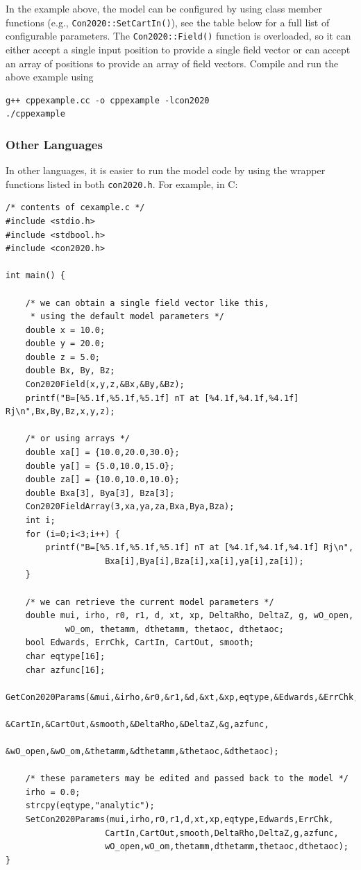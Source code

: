	In the example above, the model can be configured by using class member functions (e.g., \texttt{Con2020::SetCartIn()}), see the table below for a full list of configurable parameters. The \texttt{Con2020::Field()} function is overloaded, so it can either accept a single input position to provide a single field vector or can accept an array of positions to provide an array of field vectors. Compile and run the above example using
	
	\begin{verbatim}
g++ cppexample.cc -o cppexample -lcon2020
./cppexample
	\end{verbatim}
	
	\subsubsection{Other Languages}
	
	In other languages, it is easier to run the model code by using the wrapper functions listed in both \texttt{con2020.h}. For example, in C:
	
	\begin{verbatim}
/* contents of cexample.c */
#include <stdio.h>
#include <stdbool.h>
#include <con2020.h>
	
int main() {
	
	/* we can obtain a single field vector like this,
	 * using the default model parameters */
	double x = 10.0;
	double y = 20.0;
	double z = 5.0;
	double Bx, By, Bz;
	Con2020Field(x,y,z,&Bx,&By,&Bz);
	printf("B=[%5.1f,%5.1f,%5.1f] nT at [%4.1f,%4.1f,%4.1f] Rj\n",Bx,By,Bz,x,y,z);
	
	/* or using arrays */
	double xa[] = {10.0,20.0,30.0};
	double ya[] = {5.0,10.0,15.0};
	double za[] = {10.0,10.0,10.0};
	double Bxa[3], Bya[3], Bza[3];
	Con2020FieldArray(3,xa,ya,za,Bxa,Bya,Bza);
	int i;
	for (i=0;i<3;i++) {
		printf("B=[%5.1f,%5.1f,%5.1f] nT at [%4.1f,%4.1f,%4.1f] Rj\n",
					Bxa[i],Bya[i],Bza[i],xa[i],ya[i],za[i]);
	}
	
	/* we can retrieve the current model parameters */
	double mui, irho, r0, r1, d, xt, xp, DeltaRho, DeltaZ, g, wO_open,
			wO_om, thetamm, dthetamm, thetaoc, dthetaoc;
	bool Edwards, ErrChk, CartIn, CartOut, smooth;
	char eqtype[16];
	char azfunc[16];
	GetCon2020Params(&mui,&irho,&r0,&r1,&d,&xt,&xp,eqtype,&Edwards,&ErrChk,
					&CartIn,&CartOut,&smooth,&DeltaRho,&DeltaZ,&g,azfunc,
					&wO_open,&wO_om,&thetamm,&dthetamm,&thetaoc,&dthetaoc);
	
	/* these parameters may be edited and passed back to the model */
	irho = 0.0;
	strcpy(eqtype,"analytic");
	SetCon2020Params(mui,irho,r0,r1,d,xt,xp,eqtype,Edwards,ErrChk,
					CartIn,CartOut,smooth,DeltaRho,DeltaZ,g,azfunc,
					wO_open,wO_om,thetamm,dthetamm,thetaoc,dthetaoc);
}
	\end{verbatim}
	
